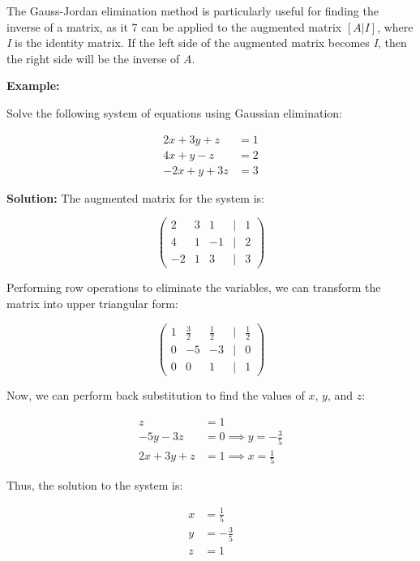The Gauss-Jordan elimination method is particularly useful for finding the inverse of a matrix, as it 7
can be applied to the augmented matrix \([A | I]\), where \emph{I} is the identity matrix. If the left side 
of the augmented matrix becomes \emph{I}, then the right side will be the inverse of \(A\).
\vspace{\baselineskip}

\textbf{Example:}
\vspace{\baselineskip}

Solve the following system of equations using Gaussian elimination:

\begin{align*}
	2x + 3y + z  & = 1 \\
	4x + y - z   & = 2 \\
	-2x + y + 3z & = 3
\end{align*}

\textbf{Solution:} The augmented matrix for the system is:

\[
	\begin{pmatrix}
		2  & 3 & 1  & | & 1 \\
		4  & 1 & -1 & | & 2 \\
		-2 & 1 & 3  & | & 3
	\end{pmatrix}
\]

Performing row operations to eliminate the variables, we can transform the matrix into upper triangular form:

\[
	\begin{pmatrix}
		1 & \frac{3}{2} & \frac{1}{2} & | & \frac{1}{2} \\
		0 & -5          & -3          & | & 0           \\
		0 & 0           & 1           & | & 1
	\end{pmatrix}
\]

Now, we can perform back substitution to find the values of \(x\), \(y\), and \(z\):

\begin{align*}
	z           & = 1                           \\
	-5y - 3z    & = 0 \implies y = -\frac{3}{5} \\
	2x + 3y + z & = 1 \implies x = \frac{1}{5}
\end{align*}

Thus, the solution to the system is:

\begin{align*}
	x & = \frac{1}{5}  \\
	y & = -\frac{3}{5} \\
	z & = 1
\end{align*}

